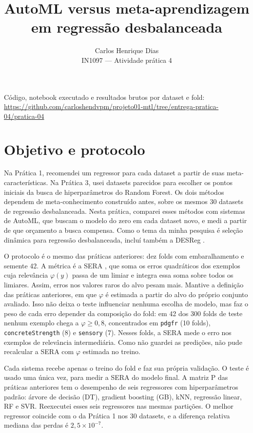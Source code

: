 \documentclass[10pt,a4paper]{article}
\title{AutoML versus meta-aprendizagem\\em regressão desbalanceada}
\author{Carlos Henrique Dias\\\small IN1097 --- Atividade prática 4}
\date{}
\begin{document}
\maketitle
\vspace{-0.5cm}
\begin{center}\small
Código, notebook executado e resultados brutos por dataset e fold:\\
\url{https://github.com/carloshendvpm/projeto01-mtl/tree/entrega-pratica-04/pratica-04}
\end{center}

\section{Objetivo e protocolo}

Na Prática 1, recomendei um regressor para cada dataset a partir de suas meta-características. Na Prática 3, usei datasets parecidos para escolher os pontos iniciais da busca de hiperparâmetros do Random Forest. Os dois métodos dependem de meta-conhecimento construído antes, sobre os mesmos 30 datasets de regressão desbalanceada. Nesta prática, comparei esses métodos com sistemas de AutoML, que buscam o modelo do zero em cada dataset novo, e medi a partir de que orçamento a busca compensa. Como o tema da minha pesquisa é seleção dinâmica para regressão desbalanceada, incluí também a DESReg \cite{desreg}.

O protocolo é o mesmo das práticas anteriores: dez folds com embaralhamento e semente 42. A métrica é a SERA \cite{ribeiro}, que soma os erros quadráticos dos exemplos cuja relevância $\varphi(y)$ passa de um limiar e integra essa soma sobre todos os limiares. Assim, erros nos valores raros do alvo pesam mais. Mantive a definição das práticas anteriores, em que $\varphi$ é estimada a partir do alvo do próprio conjunto avaliado. Isso não deixa o teste influenciar nenhuma escolha de modelo, mas faz o peso de cada erro depender da composição do fold: em 42 dos 300 folds de teste nenhum exemplo chega a $\varphi\geq0{,}8$, concentrados em \texttt{pdgfr} (10 folds), \texttt{concreteStrength} (8) e \texttt{sensory} (7). Nesses folds, a SERA mede o erro nos exemplos de relevância intermediária. Como não guardei as predições, não pude recalcular a SERA com $\varphi$ estimada no treino.

Cada sistema recebe apenas o treino do fold e faz sua própria validação. O teste é usado uma única vez, para medir a SERA do modelo final. A matriz P das práticas anteriores tem o desempenho de seis regressores com hiperparâmetros padrão: árvore de decisão (DT), gradient boosting (GB), kNN, regressão linear, RF e SVR. Reexecutei esses seis regressores nas mesmas partições. O melhor regressor coincide com o da Prática 1 nos 30 datasets, e a diferença relativa mediana das perdas é $2{,}5\times10^{-7}$.
\end{document}
